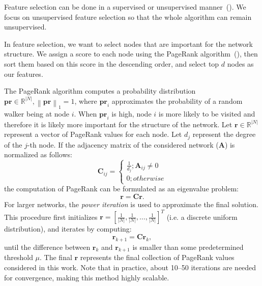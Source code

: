 \documentclass[twoside,11pt]{article}
\begin{document}
Feature selection can be done in a supervised or unsupervised manner~(\cite{saeys2007feature}). We focus on unsupervised feature selection so that the whole algorithm can remain unsupervised.

In feature selection, we want to select nodes that are important for the network structure. We assign a score to each node using the PageRank algorithm~(\cite{ilprints422}), then sort them based on this score in the descending order, and select top $d$ nodes as our features.

The PageRank algorithm computes a probability distribution $\boldsymbol{pr} \in \mathbb{R}^{|N|}, \left\lVert \boldsymbol{pr} \right\rVert_1=1$, where $\boldsymbol{pr}_i$ approximates the probability of a random walker being at  node $i$. When $\boldsymbol{pr}_i$ is high, node $i$ is more likely to be visited and therefore it is likely more important for the structure of the network. Let $\boldsymbol{r} \in \mathbb{R}^{|N|}$ represent a vector of PageRank values for each node. Let $d_{j}$ represent the degree of the $j$-th node. If the adjacency matrix of the considered network ($\boldsymbol{A}$) is normalized as follows:
\begin{equation*}
    \boldsymbol{C}_{ij} = \begin{cases}
    \frac{1}{d_{j}}; \boldsymbol{A}_{ij} \neq 0 \\
    0; otherwise
    \end{cases}
\end{equation*}
\noindent the computation of PageRank can be formulated as an eigenvalue problem:
\begin{equation*}
    \boldsymbol{r} = \boldsymbol{C}\boldsymbol{r}.
\end{equation*}
For larger networks, the \emph{power iteration} is used to approximate the final solution. This procedure first initializes $\boldsymbol{r} = [\frac{1}{|N|},\frac{1}{|N|},\dots,\frac{1}{|N|}]^T$ (i.e. a discrete uniform distribution), and iterates by computing:
\begin{equation*}
    \boldsymbol{r}_{k+1} = \boldsymbol{C} \boldsymbol{r}_k,
\end{equation*}
\noindent until the difference between $\boldsymbol{r}_k$ and $\boldsymbol{r}_{k+1}$ is smaller than some predetermined threshold $\mu$. The final $\boldsymbol{r}$ represents the final collection of PageRank values considered in this work. Note that in practice, about 10--50 iterations are needed for convergence, making this method highly scalable.
\end{document}
